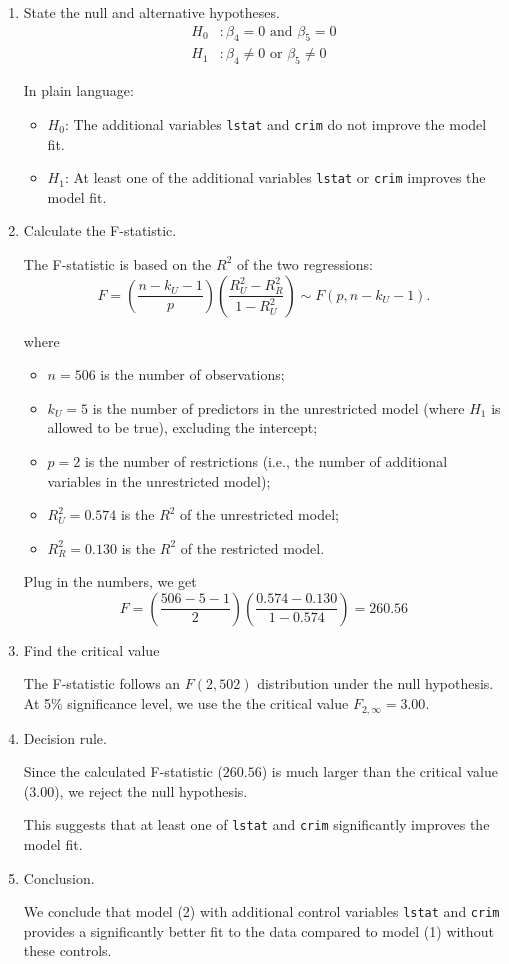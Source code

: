 \documentclass[
  12pt,
  letterpaper,
]{scrbook}
\providecommand{\tightlist}{%
  \setlength{\itemsep}{0pt}\setlength{\parskip}{0pt}}
\renewcommand{\tightlist}{\setlength{\itemsep}{0.5\baselineskip}\setlength{\parskip}{0.2\baselineskip}}
\theoremstyle{plain}
\theoremstyle{definition}
\theoremstyle{remark}
\begin{document}
\begin{enumerate}
\def\labelenumi{\arabic{enumi}.}
\item
  State the null and alternative hypotheses. \[
  \begin{aligned}
  H_0 &: \beta_4 = 0 \text{ and } \beta_5 = 0 \\
  H_1 &: \beta_4 \ne 0 \text{ or } \beta_5 \ne 0
  \end{aligned}
  \]

  In plain language:

  \begin{itemize}
  \tightlist
  \item
    \(H_0\): The additional variables \texttt{lstat} and \texttt{crim}
    do not improve the model fit.
  \item
    \(H_1\): At least one of the additional variables \texttt{lstat} or
    \texttt{crim} improves the model fit.
  \end{itemize}
\item
  Calculate the F-statistic.

  The F-statistic is based on the \(R^2\) of the two regressions: \[
  F = \left(\frac{n - k_U -1}{p}\right) \left(\frac{R_U^2-R_R^2}{1-R_U^2}\right) \sim F(p, n-k_U-1) .
  \]

  where

  \begin{itemize}
  \tightlist
  \item
    \(n = 506\) is the number of observations;
  \item
    \(k_U = 5\) is the number of predictors in the unrestricted model
    (where \(H_1\) is allowed to be true), excluding the intercept;
  \item
    \(p = 2\) is the number of restrictions (i.e., the number of
    additional variables in the unrestricted model);
  \item
    \(R_U^2 = 0.574\) is the \(R^2\) of the unrestricted model;
  \item
    \(R_R^2 = 0.130\) is the \(R^2\) of the restricted model.
  \end{itemize}

  Plug in the numbers, we get \[
  F = \left(\frac{506-5-1}{2}\right) \left(\frac{0.574-0.130}{1-0.574}\right) = 260.56
  \]
\item
  Find the critical value

  The F-statistic follows an \(F(2, 502)\) distribution under the null
  hypothesis. At 5\% significance level, we use the the critical value
  \(F_{2,\infty}=3.00.\)
\item
  Decision rule.

  Since the calculated F-statistic (\(260.56\)) is much larger than the
  critical value (\(3.00\)), we reject the null hypothesis.

  This suggests that at least one of \texttt{lstat} and \texttt{crim}
  significantly improves the model fit.
\item
  Conclusion.

  We conclude that model (2) with additional control variables
  \texttt{lstat} and \texttt{crim} provides a significantly better fit
  to the data compared to model (1) without these controls.
\end{enumerate}
\end{document}
